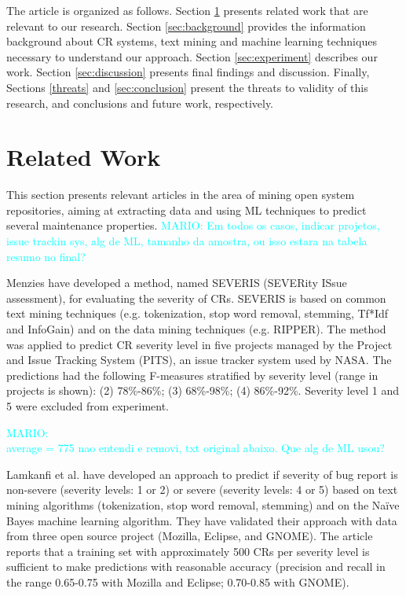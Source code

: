 \documentclass[10pt, conference]{IEEEtran}
\newcommand{\mario}[1]{\noindent\textcolor{cyan}{MARIO: {#1}}}
\newcommand{\mario}[1]{}
\begin{document}
The article is organized as follows. Section \ref{sec:relatedwork} presents related work that are relevant to our research. Section \ref{sec:background} provides the information background about CR systems, text mining and machine learning techniques necessary to understand our approach. Section \ref{sec:experiment} describes our work. Section \ref{sec:discussion} presents final findings and discussion. Finally, Sections \ref{threats} and \ref{sec:conclusion} present the threats to validity of this research, and conclusions and  future work, respectively.


\section{Related Work}\label{sec:relatedwork} 

This section presents relevant articles in the area of mining open system repositories, aiming at extracting data and using ML techniques to predict several maintenance properties. \mario{Em todos os casos, indicar projetos, issue trackin sys, alg de ML, tamanho da amostra, ou isso estara na tabela resumo no final?}

Menzies\cite{Menzies2008} have developed a method, named SEVERIS (SEVERity ISsue assessment), for evaluating the severity of CRs. SEVERIS is based on common text mining techniques (e.g. tokenization, stop word removal, stemming, Tf*Idf and InfoGain) and on the data mining techniques (e.g. RIPPER). The method was applied to predict CR severity level in five projects managed by the Project and Issue Tracking System (PITS), an issue tracker system used by NASA. The predictions had the following F-measures stratified by severity level (range in projects is shown): (2) 78\%-86\%; (3) 68\%-98\%; (4) 86\%-92\%. Severity level 1 and 5 were excluded from experiment.

\mario{\\ average = 775   nao entendi e removi, txt original abaixo. Que alg de ML usou?}

Lamkanfi et al.\cite{Lamkanfi2010} have developed an approach to predict if severity of bug report is non-severe (severity levels: 1 or 2) or severe (severity levels: 4 or 5) based on text mining algorithms (tokenization, stop word removal, stemming) and on the Naïve Bayes machine learning algorithm. They have validated their approach with data from three open source project (Mozilla, Eclipse, and GNOME). The article reports that a training set with approximately 500 CRs per severity level is sufficient to make predictions with reasonable accuracy (precision and recall in the range 0.65-0.75 with Mozilla and Eclipse; 0.70-0.85 with GNOME).
\end{document}
